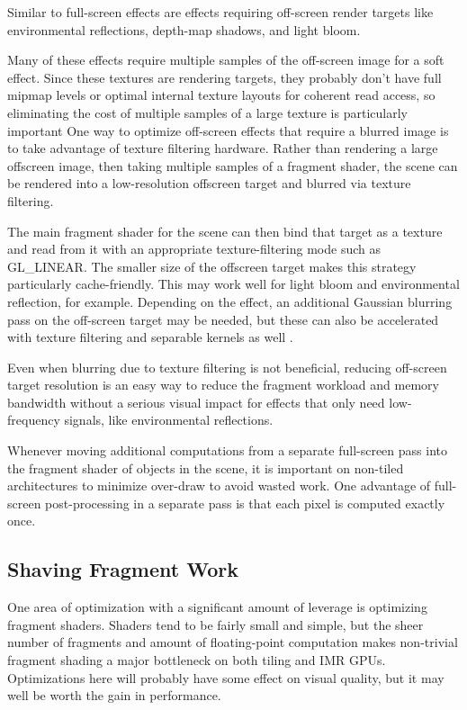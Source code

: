 Similar to full-screen effects are effects requiring off-screen render targets
like environmental reflections, depth-map shadows, and light bloom.

Many of these effects require multiple samples of the off-screen image for a
soft effect.  Since these textures are rendering targets, they probably don't
have full mipmap levels or optimal internal texture layouts for coherent read
access, so eliminating the cost of multiple samples of a large texture is
particularly important One way to optimize off-screen effects that require a
blurred image is to take advantage of texture filtering hardware.  Rather than
rendering a large offscreen image, then taking multiple samples of a fragment
shader, the scene can be rendered into a low-resolution offscreen target and
blurred via texture filtering.

The main fragment shader for the scene can then bind that target as a texture
and read from it with an appropriate texture-filtering mode such as GL\_LINEAR.
The smaller size of the offscreen target makes this strategy particularly
cache-friendly.  This may work well for light bloom and environmental
reflection, for example.  Depending on the effect, an additional Gaussian
blurring pass on the off-screen target may be needed, but these can also be
accelerated with texture filtering and separable kernels as well \cite{Rideout}.

Even when blurring due to texture filtering is not beneficial, reducing
off-screen target resolution is an easy way to reduce the fragment workload
and memory bandwidth without a serious visual impact for effects that only need
low-frequency signals, like environmental reflections.

Whenever moving additional computations from a separate full-screen pass into
the fragment shader of objects in the scene, it is important on non-tiled
architectures to minimize over-draw to avoid wasted work.  One advantage of
full-screen post-processing in a separate pass is that each pixel is computed
exactly once.

\subsection{Shaving Fragment Work}
\label{Jon-McCaffrey-Shaving-Fragment-Work}

One area of optimization with a significant amount of leverage is optimizing
fragment shaders.  Shaders tend to be fairly small and simple, but the sheer
number of fragments and amount of floating-point computation makes non-trivial
fragment shading a major bottleneck on both tiling and IMR GPUs.  Optimizations
here will probably have some effect on visual quality, but it may well be worth
the gain in performance.

